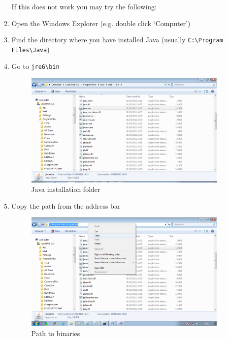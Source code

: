 \begin{enumerate}
\begin{enumerate}
		If this does not work you may try the following:
		
		\item Open the Windows Explorer (e.g. double click `Computer')
		\item Find the directory where you have installed Java (usually \verb!C:\Program Files\Java!)
		\item Go to \verb!jre6\bin!
		\begin{figure}[H]\label{fig:jre}
		\centering
		\includegraphics[width=1.0\textwidth]{img/step-by-step-win/0-1-localize-java}
		\caption{Java installation folder}
		\end{figure}
		\item Copy the path from the address bar
		\begin{figure}[H]\label{fig:address}
		\centering
		\includegraphics[width=1.0\textwidth]{img/step-by-step-win/0-2-copy-path}
		\caption{Path to binaries}
		\end{figure}
	\end{enumerate}
	
\end{enumerate}


